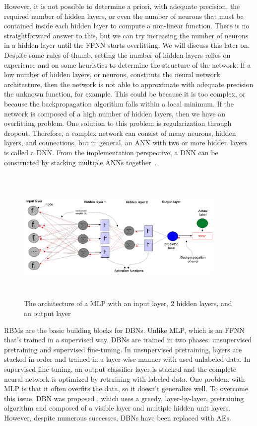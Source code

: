 \hspace*{3.5mm} However, it is not possible to determine a priori, with adequate precision, the required number of hidden layers, or even the number of neurons that must be contained inside each hidden layer to compute a non-linear function. There is no straightforward answer to this, but we can try increasing the number of neurons in a hidden layer until the FFNN starts overfitting. We will discuss this later on. Despite some rules of thumb, setting the number of hidden layers relies on experience and on some heuristics to determine the structure of the network. If a low number of hidden layers, or neurons, constitute the neural network architecture, then the network is not able to approximate with adequate precision the unknown function, for example. This could be because it is too complex, or because the backpropagation algorithm falls within a local minimum. If the network is composed of a high number of hidden layers, then we have an overfitting problem. One solution to this problem is regularization through dropout. Therefore, a complex network can consist of many neurons, hidden layers, and connections, but in general, an ANN with two or more hidden layers is called a DNN. From the implementation perspective, a DNN can be constructed by stacking multiple ANNs together~\cite{karimDLTF2018}.

\begin{figure}[h]
    \centering
    \includegraphics[width=0.9\textwidth,height=65mm]{images/ffnn_1.png}
    \caption{The architecture of a MLP with an input layer, 2 hidden layers, and an output layer}
    \label{fig:mlp_1}
\end{figure}

\hspace*{3.5mm} RBMs are the basic building blocks for DBNs. Unlike MLP, which is an FFNN that's trained in a supervised way, DBNs are trained in two phases: unsupervised pretraining and supervised fine-tuning. In unsupervised pretraining, layers are stacked in order and trained in a layer-wise manner with used unlabeled data. In supervised fine-tuning, an output classifier layer is stacked and the complete neural network is optimized by retraining with labeled data. One problem with MLP is that it often overfits the data, so it doesn't generalize well. To overcome this issue, DBN was proposed , which uses a greedy, layer-by-layer, pretraining algorithm and composed of a visible layer and multiple hidden unit layers. However, despite numerous successes, DBNs have been replaced with AEs. 

